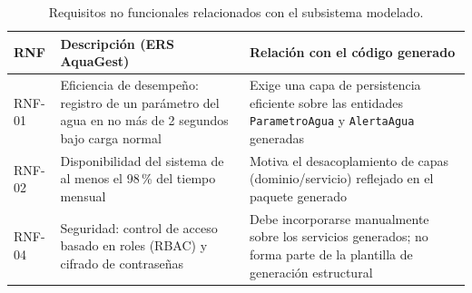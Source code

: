 \documentclass[11pt,a4paper]{article}
\begin{document}
\begin{table}[H]
\centering
\caption{Requisitos no funcionales relacionados con el subsistema modelado.}
\label{tab:anexo-rnf}
\begin{tabular}{p{1.8cm}p{6.5cm}p{4.0cm}}
\toprule
\textbf{RNF} & \textbf{Descripción (ERS AquaGest)} & \textbf{Relación con el código generado} \\
\midrule
RNF-01 & Eficiencia de desempeño: registro de un parámetro del agua en no más de 2 segundos bajo carga normal & Exige una capa de persistencia eficiente sobre las entidades \texttt{ParametroAgua} y \texttt{AlertaAgua} generadas \\
RNF-02 & Disponibilidad del sistema de al menos el 98\,\% del tiempo mensual & Motiva el desacoplamiento de capas (dominio/servicio) reflejado en el paquete generado \\
RNF-04 & Seguridad: control de acceso basado en roles (RBAC) y cifrado de contraseñas & Debe incorporarse manualmente sobre los servicios generados; no forma parte de la plantilla de generación estructural \\
\bottomrule
\end{tabular}
\end{table}
\end{document}
